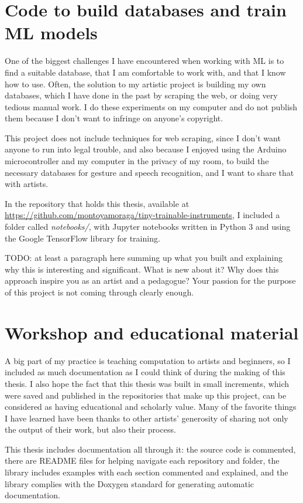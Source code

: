 \section{Code to build databases and train ML models}

One of the biggest challenges I have encountered when working with \acrshort{ML} is to find a suitable database, that I am comfortable to work with, and that I know how to use. Often, the solution to my artistic project is building my own databases, which I have done in the past by scraping the web, or doing very tedious manual work. I do these experiments on my computer and do not publish them because I don't want to infringe on anyone's copyright.

This project does not include techniques for web scraping, since I don't want anyone to run into legal trouble, and also because I enjoyed using the Arduino microcontroller and my computer in the privacy of my room, to build the necessary databases for gesture and speech recognition, and I want to share that with artists.

In the repository that holds this thesis, available at \url{https://github.com/montoyamoraga/tiny-trainable-instruments}, I included a folder called \emph{notebooks/}, with Jupyter notebooks written in Python 3 and using the Google TensorFlow library for training.

TODO: at least a paragraph here summing up what you built and explaining why this is interesting and significant. What is new about it? Why does this approach inspire you as an artist and a pedagogue? Your passion for the purpose of this project is not coming through clearly enough.

\section{Workshop and educational material}

A big part of my practice is teaching computation to artists and beginners, so I included as much documentation as I could think of during the making of this thesis. I also hope the fact that this thesis was built in small increments, which were saved and published in the repositories that make up this project, can be considered as having  educational and scholarly value. Many of the favorite things I have learned have been thanks to other artists' generosity of sharing not only the output of their work, but also their process.

This thesis includes documentation all through it: the source code is commented, there are README files for helping navigate each repository and folder, the library includes examples with each section commented and explained, and the library complies with the Doxygen standard for generating automatic documentation.

